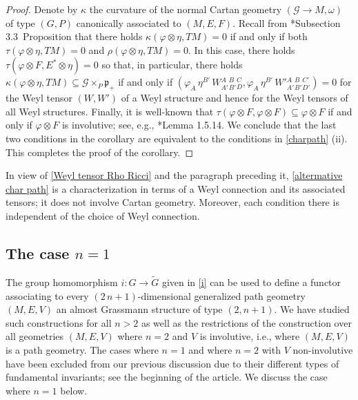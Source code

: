 \documentclass[11pt]{amsart}
\begin{document}
\begin{proof}
Denote by $\kappa$ the curvature of the normal Cartan geometry $(\mathcal G\to M,\omega)$ of type $(G,P)$ canonically associated to $(M,E,F)$. Recall from \cite{Cap06}*{Subsection 3.3\ Proposition} that there holds $\kappa(\varphi\otimes\eta,TM)=0$ if and only if both $\tau(\varphi\otimes\eta,TM)=0$ and $\rho(\varphi\otimes\eta,TM)=0$. In this case, there holds $\tau(\varphi\otimes F,E^*\otimes\eta)=0$ so that, in particular, there holds $\kappa(\varphi\otimes\eta,TM)\subseteq\mathcal G\times_P\mathfrak p_+$ if and only if $(\varphi_A\,\eta^{B'}\,W{}^A_{A'}{}^B_{B'}{}^{C}_{D},\varphi_A\,\eta^{B'}\,
W'{}^A_{A'}{}^B_{B'}{}^{C'}_{D'})=0$ for the Weyl tensor $(W,W')$ of a Weyl structure and hence for the Weyl tensors of all Weyl structures. Finally, it is well-known that $\tau(\varphi\otimes F,\varphi\otimes F)\subseteq\varphi\otimes F$ if and only if $\varphi\otimes F$ is involutive; see, e.g., \cite{Book}*{Lemma 1.5.14}. We conclude that the last two conditions in the corollary are equivalent to the conditions in \cref{charpath} (ii). This completes the proof of the corollary.
\end{proof}
In view of \cref{Weyl tensor Rho Ricci} and the paragraph preceding it, \cref{altermative char path} is a characterization in terms of a Weyl connection and its associated tensors; it does not involve Cartan geometry. Moreover, each condition there is independent of the choice of Weyl connection.
\subsection{The case $n=1$}\label{LC}
The group homomorphism $i:G\to\tilde G$ given in \eqref{i} can be used to define a functor associating to every $(2\,n+1)$-dimensional generalized path geometry $(M,E,V)$ an almost Grassmann structure of type $(2,n+1)$. We have studied such constructions for all $n>2$ as well as the restrictions of the construction over all geometries $(M,E,V)$ where $n=2$ and $V$ is involutive, i.e., where $(M,E,V)$ is a path geometry. The cases where $n=1$ and where $n=2$ with $V$ non-involutive have been excluded from our previous discussion due to their different types of fundamental invariants; see the beginning of the article. We discuss the case where $n=1$ below.
\end{document}
